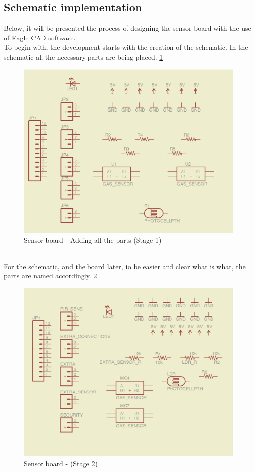 \documentclass[12pt,a4paper]{report}
\begin{document}
\subsection{Schematic implementation}
Below, it will be presented the process of designing the sensor board with the use of Eagle CAD software.
\ \\
To begin with, the development starts with the creation of the schematic. In the schematic all the necessary parts are being placed. \ref{Sensor-brd-s1}
\ \\
\begin{figure}[H]
\centering
\includegraphics*[scale=0.25]{sens_brd_s1}
\caption{Sensor board - Adding all the parts (Stage 1)}
\label{Sensor-brd-s1}
\end{figure}
\ \\
For the schematic, and the board later, to be easier and clear what is what, the parts are named accordingly. \ref{Sensor-brd-s2}
\begin{figure}[H]
\centering
\includegraphics*[scale=0.25]{sens_brd_s2}
\caption{Sensor board -  (Stage 2)}
\label{Sensor-brd-s2}
\end{figure}
\end{document}
